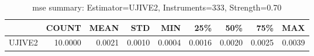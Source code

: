 \begin{table}[ht]
\centering
\caption{mse summary: Estimator=UJIVE2, Instruments=333, Strength=0.70}
\begin{tabular}{lrrrrrrrr}
\toprule
 & COUNT & MEAN & STD & MIN & 25\% & 50\% & 75\% & MAX \\
\midrule
UJIVE2 & 10.0000 & 0.0021 & 0.0010 & 0.0004 & 0.0016 & 0.0020 & 0.0025 & 0.0039 \\
\bottomrule
\end{tabular}
\end{table}

